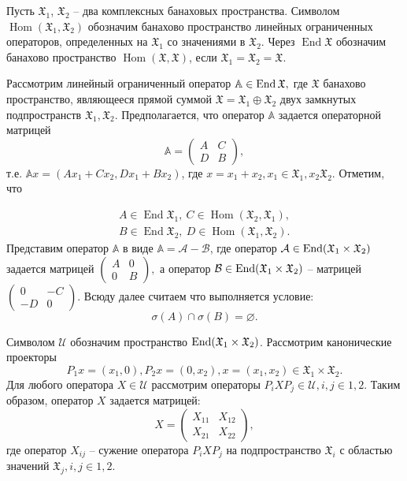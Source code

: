 Пусть $\mathfrak{X}_1$, $\mathfrak{X}_2$ -- два комплексных банаховых пространства. Символом 
$\operatorname{Hom}(\mathfrak{X}_1, \mathfrak{X}_2)$ обозначим банахово пространство линейных ограниченных \\ операторов, определенных на $\mathfrak{X}_1$ со значениями в $\mathfrak{X}_2$. Через 
$\operatorname{End}\mathfrak{X}$ обозначим банахово пространство $\operatorname{Hom}(\mathfrak{X}, \mathfrak{X})$, 
если $\mathfrak{X}_1 = \mathfrak{X}_2 = \mathfrak{X}$.

Рассмотрим линейный ограниченный оператор $\mathbb{A} \in \operatorname{End}\mathfrak{X},$
где $\mathfrak{X}$ банахово пространство, являющееся прямой суммой 
$\mathfrak{X} = \mathfrak{X}_1 \oplus \mathfrak{X}_2$ двух замкнутых подпространств 
$\mathfrak{X}_1, \mathfrak{X}_2$. Предполагается, что оператор $\mathbb{A}$ задается операторной матрицей
$$
\mathbb{A} = \begin{pmatrix}
		A & C \\
		D & B
	\end{pmatrix},
$$
т.е. $\mathbb{A}x = (A x_1 + C x_2, D x_1 + B x_2)$, где $x = x_1 + x_2, x_1 \in \mathfrak{X}_1, x_2 \mathfrak{X}_2$. Отметим, что

\begin{align*}
A \in \operatorname{End}\mathfrak{X}_1, \ C \in \operatorname{Hom}(\mathfrak{X}_2, \mathfrak{X}_1), \\
B \in \operatorname{End}\mathfrak{X}_2, \ D \in \operatorname{Hom}(\mathfrak{X}_1, \mathfrak{X}_2).
\end{align*}
Представим оператор $\mathbb{A}$ в виде $\mathbb{A} = \mathcal{A} - \mathcal{B}$, где оператор 
$\mathcal{A} \in \operatorname{End}(\mathfrak{X}_1 \times \mathfrak{X}_2)$ задается матрицей 
$\begin{pmatrix}
		A & 0 \\
		0 & B
\end{pmatrix}, $ а оператор $\mathcal{B} \in \operatorname{End}(\mathfrak{X}_1 \times \mathfrak{X}_2)$ -- матрицей
$\begin{pmatrix}
		0 & -C \\
		-D & 0
\end{pmatrix}.$
Всюду далее считаем что выполняется условие:
$$
\sigma(A) \cap \sigma(B) = {\varnothing}.
$$

Символом $\mathcal{U}$ обозначим пространство $\operatorname{End}(\mathfrak{X}_1 \times \mathfrak{X}_2)$. Рассмотрим канонические проекторы
$$
P_1x = (x_1, 0), P_2x = (0, x_2), x = (x_1, x_2) \in \mathfrak{X}_1 \times \mathfrak{X}_2.
$$
Для любого оператора $X \in \mathcal{U}$ рассмотрим операторы $P_iXP_j \in \mathcal{U}, i,j \in {1,2}.$ Таким образом, оператор $X$ задается матрицей:
$$
X = \begin{pmatrix}
		X_{11} & X_{12} \\
		X_{21} & X_{22}
	\end{pmatrix},
$$
где оператор $X_{ij}$ -- сужение оператора $P_iXP_j$ на подпространство $\mathfrak{X}_i$ с областью значений $\mathfrak{X}_j, i,j \in {1,2}.$


